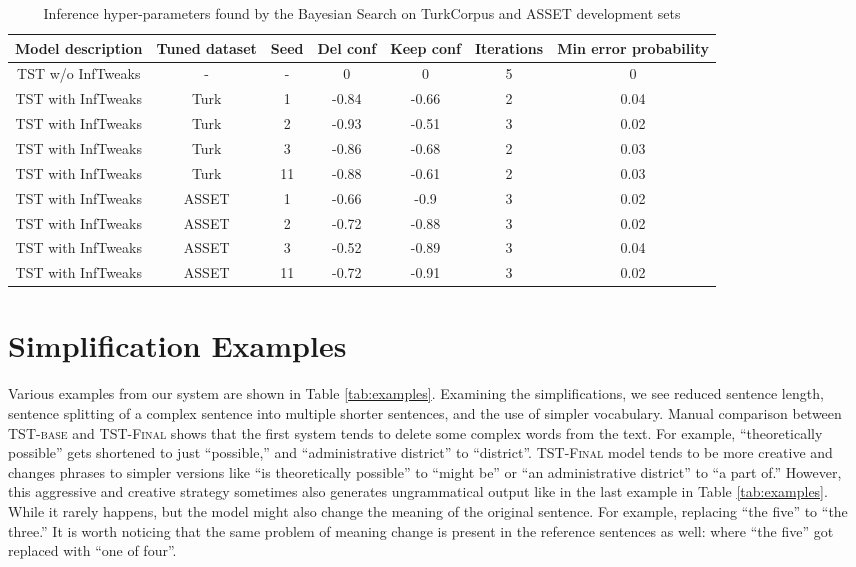 \documentclass[11pt,a4paper]{article}
\begin{document}
\begin{table*}[b]
\begin{center}
\small
\begin{tabular}{ccccccc}
\toprule
\textbf{Model description} & \textbf{Tuned dataset} & \textbf{Seed} & \textbf{Del conf} &	\textbf{Keep conf} & \textbf{Iterations} &	\textbf{Min error probability}  \\
\toprule
TST w/o InfTweaks & - & - & 0 & 0 & 5 & 0 \\
TST with InfTweaks & Turk & 1 & -0.84 &	-0.66 &	2 & 0.04 \\
TST with InfTweaks & Turk & 2 &	-0.93 &	-0.51 &	3 &	0.02 \\
TST with InfTweaks & Turk & 3	&-0.86 &	-0.68 &	2 &	0.03 \\
TST with InfTweaks & Turk & 11	& -0.88 & -0.61 &	2 &	0.03 \\
TST with InfTweaks & ASSET & 1 & -0.66 &	-0.9 &	3 & 0.02 \\
TST with InfTweaks & ASSET & 2 & -0.72 &	-0.88 &	3 &	0.02 \\
TST with InfTweaks & ASSET & 3	& -0.52 &	-0.89 &	3 & 0.04 \\
TST with InfTweaks & ASSET & 11	& -0.72 &	-0.91 &	3 &	0.02 \\


\bottomrule
\end{tabular}
\caption{Inference hyper-parameters found by the Bayesian Search on TurkCorpus and ASSET development sets}
\label{tab:inference_tweaks}
\end{center}
\end{table*}

\newpage

\section{Simplification Examples}

Various examples from our system are shown in Table \ref{tab:examples}. Examining the simplifications, we see reduced sentence length, sentence splitting of a complex sentence into multiple shorter sentences, and the use of simpler vocabulary. Manual comparison between \textsc{TST-base} and \textsc{TST-Final} shows that the first system tends to delete some complex words from the text. For example, ``theoretically possible” gets shortened to just ``possible,” and ``administrative district” to ``district”. \textsc{TST-Final} model tends to be more creative and changes phrases to simpler versions like “is theoretically possible” to ``might be” or ``an administrative district” to ``a part of.” However, this aggressive and creative strategy sometimes also generates ungrammatical output like in the last example in Table \ref{tab:examples}. While it rarely happens, but the model might also change the meaning of the original sentence. For example, replacing ``the five” to ``the three.” It is worth noticing that the same problem of meaning change is present in the reference sentences as well: where ``the five” got replaced with ``one of four”.
\end{document}
